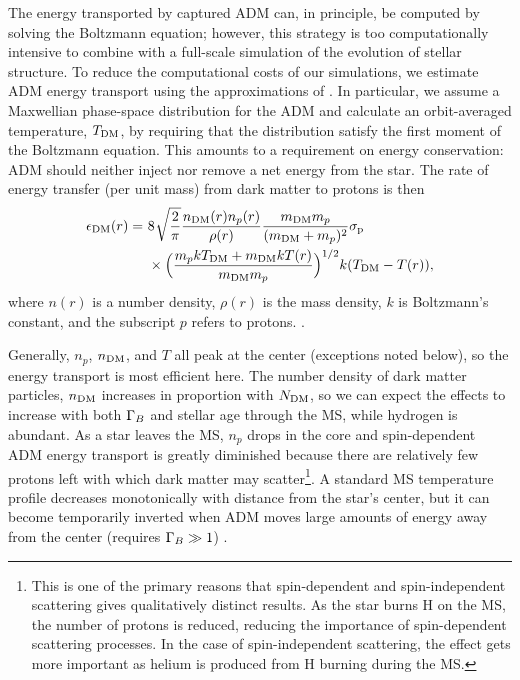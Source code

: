\documentclass[useAMS,usenatbib]{mnras}
\begin{document}
  The energy transported by captured ADM can, in principle, be computed by solving the Boltzmann equation; however, this strategy is too computationally intensive to combine with a full-scale simulation of the evolution of stellar structure. To reduce the computational costs of our simulations, we estimate ADM energy transport using the approximations of \citet{Spergel1985EffectInterior}. In particular, we assume a Maxwellian phase-space distribution for the ADM and calculate an orbit-averaged temperature, $T_{\mathrm{DM}}$, by requiring that the distribution satisfy the first moment of the Boltzmann equation. This amounts to a requirement on energy conservation: ADM should neither inject nor remove a net energy from the star. The rate of energy transfer (per unit mass) from dark matter to protons is then
  \begin{align}
  \begin{split}
  \epsilon_{\mathrm{DM}}(r) =\ & 8\ \sqrt[]{\frac{2}{\pi}} \frac{n_{\mathrm{DM}}(r) n_p(r)}{\rho(r)} \frac{m_{\mathrm{DM}} m_p}{(m_{\mathrm{DM}}+m_p)^2} \sigma_{\mathrm{p}}\\
  & \times \Big(\frac{m_p k T_{\mathrm{DM}} + m_{\mathrm{DM}} k T(r)}{m_{\mathrm{DM}} m_p}\Big)^{1/2} k (T_{\mathrm{DM}} - T(r)),
  \label{eq:xheat}
  \end{split}
  \end{align}
  where $n(r)$ is a number density, $\rho(r)$ is the mass density, $k$ is Boltzmann's constant, and the subscript $p$ refers to protons. \citep[See][for a detailed derivation]{Spergel1985EffectInterior}.

  Generally, $n_p$, $n_{\mathrm{DM}}$, and $T$ all peak at the center (exceptions noted below), so the energy transport is most efficient here. The number density
  of dark matter particles, $n_{\mathrm{DM}}$ increases in proportion with $N_{\mathrm{DM}}$, so we can expect the effects to increase with both $\Gamma_B$ and stellar age through the MS, while hydrogen is abundant. As a star leaves the MS, $n_p$ drops in the core and spin-dependent ADM energy transport is greatly diminished because there are relatively few protons left with which dark matter may scatter\footnote{This is one of the primary reasons that spin-dependent and spin-independent scattering gives qualitatively distinct results. As the star burns H on the MS, the number of protons is reduced, reducing the importance of spin-dependent scattering processes. In the case of spin-independent scattering, the effect gets more important as helium
  is produced from H burning during the MS.}. A standard MS temperature profile decreases monotonically with distance from the star's center, but it can become temporarily inverted when ADM moves large amounts of energy away from the center (requires $\Gamma_B \gg 1$) . 
\end{document}

